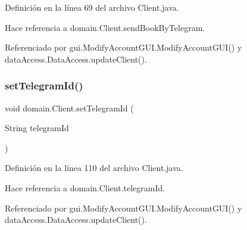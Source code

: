 Definición en la línea 69 del archivo Client.\+java.


\begin{DoxyCode}{0}

\end{DoxyCode}


Hace referencia a domain.\+Client.\+send\+Book\+By\+Telegram.



Referenciado por gui.\+Modify\+Account\+G\+U\+I.\+Modify\+Account\+G\+U\+I() y data\+Access.\+Data\+Access.\+update\+Client().

\mbox{\label{classdomain_1_1_client_aa0ab199ddacd36d8feb16cff4c01a506}} 
\subsubsection{\texorpdfstring{setTelegramId()}{setTelegramId()}}
{\footnotesize\ttfamily void domain.\+Client.\+set\+Telegram\+Id (\begin{DoxyParamCaption}\item[{String}]{telegram\+Id }\end{DoxyParamCaption})}



Definición en la línea 110 del archivo Client.\+java.


\begin{DoxyCode}{0}

\end{DoxyCode}


Hace referencia a domain.\+Client.\+telegram\+Id.



Referenciado por gui.\+Modify\+Account\+G\+U\+I.\+Modify\+Account\+G\+U\+I() y data\+Access.\+Data\+Access.\+update\+Client().


